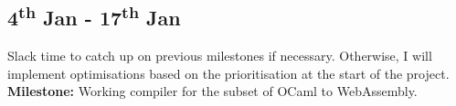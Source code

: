 \documentclass[12pt]{article}
\begin{document}









\subsection*{4\textsuperscript{th} Jan - 17\textsuperscript{th} Jan}%
Slack time to catch up on previous milestones if necessary. Otherwise, I will implement optimisations based on the prioritisation at the start of the project.\\
\textbf{Milestone: }Working compiler for the subset of OCaml to WebAssembly.
\end{document}
